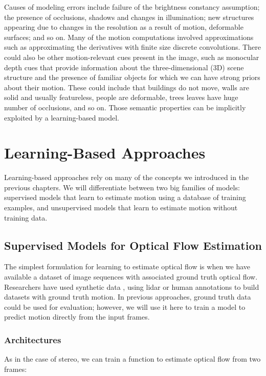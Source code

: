 Causes of modeling errors include failure of the brightness constancy assumption; the presence of occlusions, shadows and changes in illumination; new structures appearing due to changes in the resolution as a result of motion, deformable surfaces; and so on. Many of the motion computations involved approximations such as approximating the derivatives with finite size discrete convolutions. There could also be other motion-relevant cues present in the image, such as monocular depth cues that provide information about the three-dimensional (3D) scene structure and the presence of familiar objects for which we can have strong priors about their motion. These could include that buildings do not move, walls are solid and usually featureless, people are deformable, trees leaves have huge number of occlusions, and so on. Those semantic properties can be implicitly exploited by a learning-based model.

\section{Learning-Based Approaches}


Learning-based approaches rely on many of the concepts we introduced in the previous chapters. We will differentiate between two big families of models: supervised models that learn to estimate motion using a database of training examples, and unsupervised models that learn to estimate motion without training data.


\subsection{Supervised Models for Optical Flow Estimation}

The simplest formulation for learning to estimate optical flow is when we have available a dataset of image sequences with associated ground truth optical flow. Researchers have used synthetic data \cite{Butler:ECCV:2012}, using lidar \cite{Geiger2013} or human annotations \cite{Liu2008} to build datasets with ground truth motion. In previous approaches, ground truth data could be used for evaluation; however, we will use it here to train a model to predict motion directly from the input frames.

\subsubsection{Architectures}

As in the case of stereo, we can train a function to estimate optical flow from two frames:

